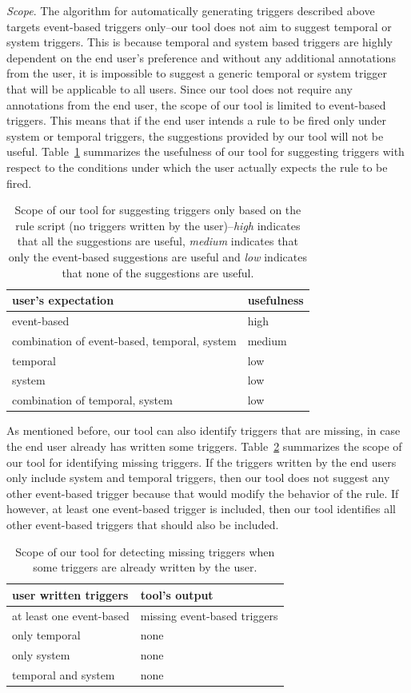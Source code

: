 \documentclass{sig-alternate-05-2015}
\begin{document}
\emph{Scope}. The algorithm for automatically generating triggers described above targets event-based triggers only--our tool does not aim to suggest temporal or system triggers. This is because temporal and system based triggers are highly dependent on the end user's preference and without any additional annotations from the user, it is impossible to suggest a generic temporal or system trigger that will be applicable to all users. Since our tool does not require any annotations from the end user, the scope of our tool is limited to event-based triggers. This means that if the end user intends a rule to be fired only under system or temporal triggers, the suggestions provided by our tool will not be useful. Table~\ref{tab:scope1} summarizes the usefulness of our tool for suggesting triggers with respect to the conditions under which the user actually expects the rule to be fired.
\begin{table}[ht]
\centering
\begin{tabular}{|l|l|}
\hline
user's expectation & usefulness \\ \hline
event-based & high \\ \hline
combination of event-based, temporal, system  & medium \\ \hline
temporal & low \\\hline
system & low \\ \hline
combination of temporal, system & low  \\ \hline
\end{tabular}
\caption{Scope of our tool for suggesting triggers only based on the rule script (no triggers written by the user)--\textit{high} indicates that all the suggestions are useful, \textit{medium} indicates that only the event-based suggestions are useful and \textit{low} indicates that none of the suggestions are useful. }
\label{tab:scope1}
\end{table}

As mentioned before, our tool can also identify triggers that are missing, in case the end user already has written some triggers. Table~\ref{tab:scope2} summarizes the scope of our tool for identifying missing triggers. If the triggers written by the end users only include system and temporal triggers, then our tool does not suggest any other event-based trigger because that would modify the behavior of the rule. If however, at least one event-based trigger is included, then our tool identifies all other event-based triggers that should also be included. 
\begin{table}[ht]
\centering
\begin{tabular}{|l|l|}
\hline
user written triggers & tool's output \\ \hline
at least one event-based & missing event-based triggers \\ \hline
only temporal & none \\\hline
only system & none \\ \hline
temporal and system & none  \\ \hline
\end{tabular}
\caption{Scope of our tool for detecting missing triggers when some triggers are already written by the user.}
\label{tab:scope2}
\end{table}
\end{document}
